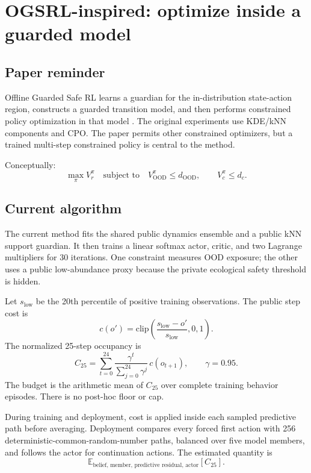 \documentclass[11pt,a4paper]{article}
\begin{document}
\section{OGSRL-inspired: optimize inside a guarded model}

\subsection{Paper reminder}

Offline Guarded Safe RL learns a guardian for the in-distribution state-action region, constructs a
guarded transition model, and then performs constrained policy optimization in that model
\cite{ogsrl2025}. The original experiments use KDE/kNN components and CPO. The paper permits other
constrained optimizers, but a trained multi-step constrained policy is central to the method.

Conceptually:
\[
\max_\pi V_r^\pi
\quad\text{subject to}\quad
V_{\mathrm{OOD}}^\pi\leq d_{\mathrm{OOD}},
\qquad
V_c^\pi\leq d_c.
\]

\subsection{Current algorithm}

The current method fits the shared public dynamics ensemble and a public kNN support guardian. It
then trains a linear softmax actor, critic, and two Lagrange multipliers for 30 iterations. One
constraint measures OOD exposure; the other uses a public low-abundance proxy because the private
ecological safety threshold is hidden.

Let $s_{\mathrm{low}}$ be the 20th percentile of positive training observations. The public step
cost is
\[
c(o')=\mathrm{clip}\left(\frac{s_{\mathrm{low}}-o'}{s_{\mathrm{low}}},0,1\right).
\]
The normalized 25-step occupancy is
\[
C_{25}=\sum_{t=0}^{24}
\frac{\gamma^t}{\sum_{j=0}^{24}\gamma^j}\,c(o_{t+1}),
\qquad \gamma=0.95.
\]
The budget is the arithmetic mean of $C_{25}$ over complete training behavior episodes. There is no
post-hoc floor or cap.

During training and deployment, cost is applied inside each sampled predictive path before
averaging. Deployment compares every forced first action with 256 deterministic-common-random-number
paths, balanced over five model members, and follows the actor for continuation actions. The
estimated quantity is
\[
\mathbb E_{\text{belief, member, predictive residual, actor}}[C_{25}].
\]
\end{document}
